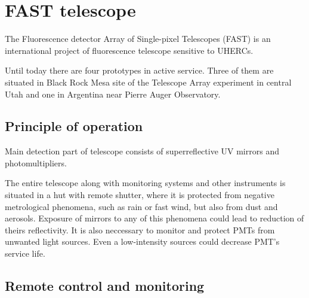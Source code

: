 
\chapter{FAST telescope}
The  Fluorescence  detector  Array  of  Single-pixel  Telescopes  (FAST) is an international project of fluorescence telescope sensitive to UHERCs. 
\par
Until today there are four prototypes in active service. Three of them are situated in Black Rock Mesa site of the Telescope Array experiment in central Utah and one in Argentina near Pierre Auger Observatory.
\section{Principle of operation}
Main detection part of telescope consists of superreflective UV mirrors and photomultipliers. 


\par
The entire telescope along with monitoring systems and other instruments is situated in a hut with remote shutter, where it is protected from negative metrological phenomena, such as rain or fast wind, but also from dust and aerosols. Exposure of mirrors to any of this phenomena could lead to reduction of theirs reflectivity. It is also neccessary to monitor and protect PMTs from unwanted light sources. Even a low-intensity sources could decrease PMT's service life.

\section{Remote control and monitoring}


\section{}




